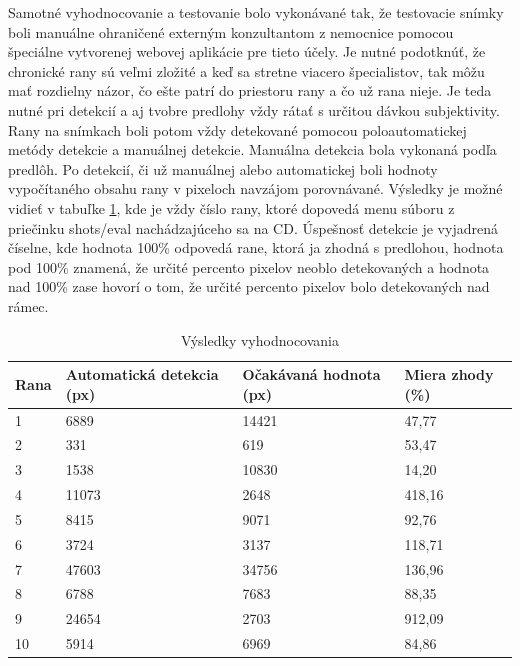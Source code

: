 Samotné vyhodnocovanie a testovanie bolo vykonávané tak, že testovacie snímky boli manuálne ohraničené externým konzultantom z nemocnice pomocou špeciálne vytvorenej webovej aplikácie pre tieto účely. Je nutné podotknúť, že chronické rany sú veľmi zložité a keď sa stretne viacero špecialistov, tak môžu mať rozdielny názor, čo ešte patrí do priestoru rany a čo už rana nieje. Je teda nutné pri detekcií a aj tvobre predlohy vždy rátať s určitou dávkou subjektivity. Rany na snímkach boli potom vždy detekované pomocou poloautomatickej metódy detekcie a manuálnej detekcie. Manuálna detekcia bola vykonaná podľa predlôh. Po detekcií, či už manuálnej alebo automatickej boli hodnoty vypočítaného obsahu rany v pixeloch navzájom porovnávané. Výsledky je možné vidieť v tabuľke \ref{tab:result}, kde je vždy číslo rany, ktoré dopovedá menu súboru z priečinku shots/eval nachádzajúceho sa na CD. Úspešnosť detekcie je vyjadrená číselne, kde hodnota 100\% odpovedá rane, ktorá ja zhodná s predlohou, hodnota pod 100\% znamená, že určité percento pixelov neoblo detekovaných a hodnota nad 100\% zase hovorí o tom, že určité percento pixelov bolo detekovaných nad rámec.
\begin{table}[h]
\centering
\label{tab:result}
\begin{tabular}{|l|l|l|l|}
\hline
Rana & Automatická detekcia (px) & Očakávaná hodnota (px) & Miera zhody (\%) \\ \hline
1    & 6889                      & 14421                             & 47,77         \\ \hline
2    & 331                       & 619                               & 53,47         \\ \hline
3    & 1538                      & 10830                             & 14,20        \\ \hline
4    & 11073                     & 2648                              & 418,16        \\ \hline
5    & 8415                      & 9071                              & 92,76        \\ \hline
6    & 3724                      & 3137                              & 118,71        \\ \hline
7    & 47603                     & 34756                             & 136,96         \\ \hline
8    & 6788                      & 7683                              & 88,35        \\ \hline
9    & 24654                     & 2703                              & 912,09        \\ \hline
10   & 5914                      & 6969                              & 84,86        \\ \hline
\end{tabular}
\caption{Výsledky vyhodnocovania}
\end{table}
